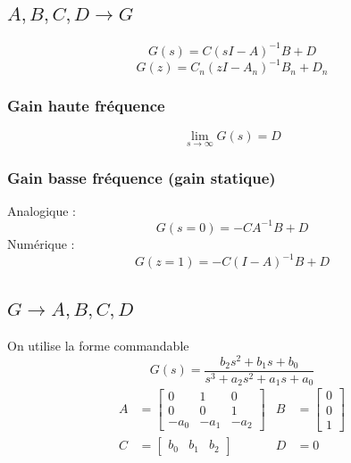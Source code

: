 \documentclass[resume]{subfiles}
\begin{document}
\subsection{$A,B,C,D \longrightarrow G$}
$$G(s)=C(sI-A)^{-1}B+D$$
$$G(z)=C_n(zI-A_n)^{-1}B_n+D_n$$
\subsubsection{Gain haute fréquence}
$$\lim_{s\to\infty}G(s)=D$$
\subsubsection{Gain basse fréquence (gain statique)}
Analogique : $$G(s=0)=-CA^{-1}B+D$$
Numérique  : $$G(z=1)=-C(I-A)^{-1}B+D$$

\subsection{$G\longrightarrow A,B,C,D$}
On utilise la forme commandable
$$G(s)=\frac{b_2s^2+b_1s+b_0}{s^3+a_2s^2+a_1s+a_0}$$
$$\boxed{\begin{split}
A&=\begin{bmatrix}0 & 1 & 0\\0 & 0 &1\\-a_0 & -a_1 & -a_2\end{bmatrix} &
B&= \begin{bmatrix}
0\\0\\1
\end{bmatrix}\\
C&=\begin{bmatrix}b_0 & b_1 & b_2\end{bmatrix} & D&=0\end{split}}$$
\end{document}
